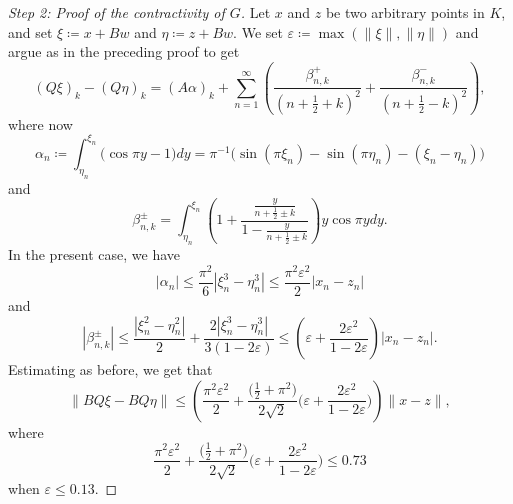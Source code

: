 \documentclass[12pt]{amsart}
\theoremstyle{plain}
\begin{document}
\begin{proof}[Step 2: Proof of the contractivity of $G$] Let $x$ and $z$ be two arbitrary points in $K$, and set $\xi\coloneqq x+Bw$ and $\eta\coloneqq z+Bw$. We set
$\varepsilon\coloneqq \max(\| \xi\|, \| \eta \|)$ and argue as in the preceding proof to get
\[ (Q\xi)_k - (Q\eta)_k = (A\alpha)_k + \sum_{n=1}^\infty \left(\frac{\beta_{n,k}^+}{(n+\frac12+k)^2} +\frac{\beta_{n,k}^-}{(n+\frac12-k)^2}\right), \]
where now
\[ \alpha_n\coloneqq  \int_{\eta_n}^{\xi_n} \big(\cos \pi y-1\big) dy = \pi^{-1}\big(\sin (\pi \xi_n)-\sin (\pi \eta_n)-(\xi_n-\eta_n)\big) \]
and 
\[ \beta_{n,k}^{\pm}= \int_{\eta_n}^{\xi_n} \left(1+\frac{\frac{y}{n+\frac12\pm k}}{1-\frac{y}{n+\frac12\pm k}}\right)y\cos\pi y dy .\] 
In the present case, we have
\[ |\alpha_n| \le \frac{\pi^2}{6}|\xi_n^3-\eta_n^3|\le \frac{\pi^2\varepsilon^2}{2}|x_n-z_n| \]
 and
 \[ |\beta_{n,k}^{\pm}| \le \frac{|\xi_n^2-\eta_n^2|}{2} +\frac{2|\xi_n^3-\eta_n^3|}{3(1-2\varepsilon)}\le \left(\varepsilon+\frac{2\varepsilon^2}{1-2\varepsilon}\right)  |x_n-z_n|.\]
 Estimating as before, we get that 
 \[ \| BQ \xi - BQ \eta \| \le  \left(\frac{\pi^2\varepsilon^2}{2}+\frac{\big(\frac{1}{2}+\pi^2\big)}{2\sqrt{2}}\big(\varepsilon+\frac{2\varepsilon^2}{1-2\varepsilon}\big)   \right) \| x-z\|, \] 
 where 
 \[ \frac{\pi^2\varepsilon^2}{2}+\frac{\big(\frac{1}{2}+\pi^2\big)}{2\sqrt{2}}\big(\varepsilon+\frac{2\varepsilon^2}{1-2\varepsilon}\big)\le 0.73\]
 when $\varepsilon\le 0.13$.
 \end{proof}

 

\end{document}
